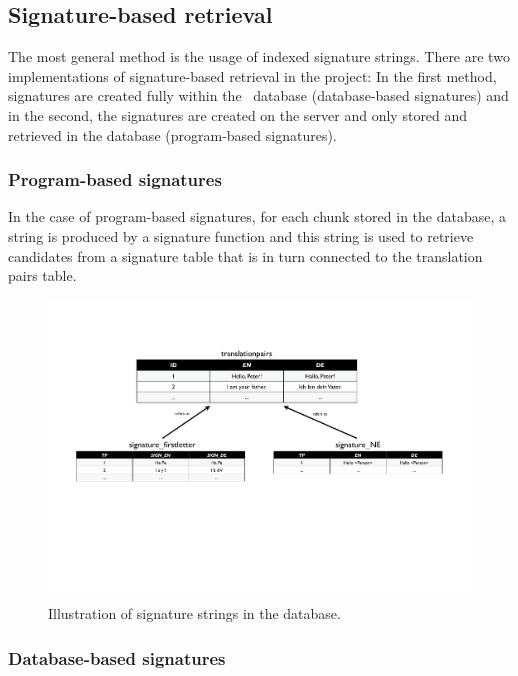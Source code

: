 



\subsection{Signature-based retrieval}


The most general method is the usage of indexed signature strings. There are two implementations of signature-based retrieval in the project: In the first method, signatures are created fully within the \postgres~database (database-based signatures) and in the second, the signatures are created on the server and only stored and retrieved in the
database (program-based signatures).  


\subsubsection*{Program-based signatures}

In the case of program-based signatures, for each chunk stored in the database, a string is produced by a signature function and this string is used to retrieve candidates from a signature table that is in turn
connected to the translation pairs table.

\begin{figure}[h!]
	\centering
		\includegraphics[width=17cm]{figures/core/signatures.pdf}
	\caption{Illustration of signature strings in the database.}
	\label{fig:figures_core_signatures}
\end{figure}


\subsubsection*{Database-based signatures}

